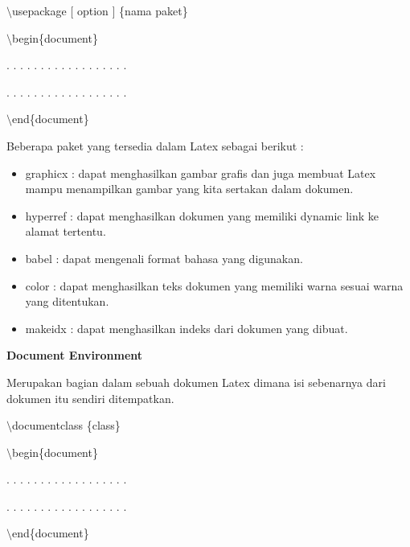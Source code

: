 $\setminus$usepackage $[$ option $]$ \{nama paket\}\par \vspace{12pt}

$\setminus$begin\{document\}\par \vspace{12pt}

. . . . . . . . . . . . . . . . . .

. . . . . . . . . . . . . . . . . .
\par \vspace{12pt}
$\setminus$end\{document\}\par \vspace{12pt}

Beberapa paket yang tersedia dalam Latex sebagai berikut :

\begin{itemize}
\item graphicx : dapat menghasilkan gambar grafis dan juga membuat Latex mampu menampilkan gambar yang kita sertakan dalam dokumen.
\item hyperref : dapat menghasilkan dokumen yang memiliki dynamic link ke alamat tertentu.
\item babel : dapat mengenali format bahasa yang digunakan.
\item color : dapat menghasilkan teks dokumen yang memiliki warna sesuai warna yang ditentukan.
\item makeidx : dapat menghasilkan indeks dari dokumen yang dibuat.
\end{itemize}
\textbf{Document Environment}\par \vspace{12pt}

Merupakan bagian dalam sebuah dokumen Latex dimana isi sebenarnya dari dokumen itu sendiri ditempatkan.
\par \vspace{12pt}
$\setminus$documentclass \{class\}\par \vspace{12pt}

$\setminus$begin\{document\}\par \vspace{12pt}

. . . . . . . . . . . . . . . . . .

. . . . . . . . . . . . . . . . . .\par \vspace{12pt}

$\setminus$end\{document\}\par \vspace{12pt}

